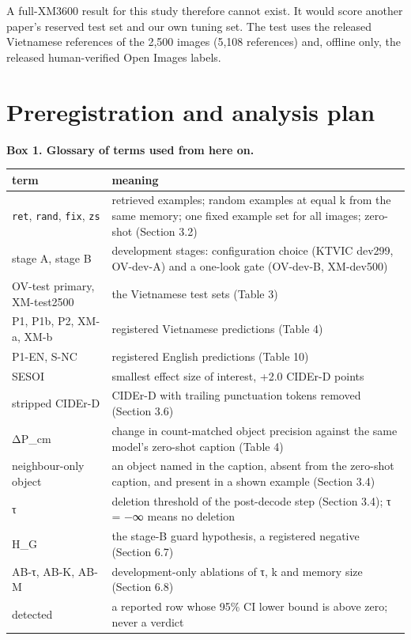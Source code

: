 A full-XM3600 result for this study therefore cannot exist. It would score another paper's reserved
test set and our own tuning set. The test uses the released Vietnamese references of the 2,500
images (5,108 references) and, offline only, the released human-verified Open Images labels.

\section{Preregistration and analysis plan}\label{preregistration-and-analysis-plan}

\textbf{Box 1. Glossary of terms used from here on.}

\begin{longtable}[]{@{}
  >{\raggedright\arraybackslash}p{}
  >{\raggedright\arraybackslash}p{}@{}}
\toprule\noalign{}
\begin{minipage}[b]{\linewidth}\raggedright
term
\end{minipage} & \begin{minipage}[b]{\linewidth}\raggedright
meaning
\end{minipage} \\
\midrule\noalign{}
\endhead
\bottomrule\noalign{}
\endlastfoot
\texttt{ret}, \texttt{rand}, \texttt{fix}, \texttt{zs} & retrieved examples; random examples at
equal k from the same memory; one fixed example set for all images; zero-shot (Section 3.2) \\
stage A, stage B & development stages: configuration choice (KTVIC dev299, OV-dev-A) and a one-look
gate (OV-dev-B, XM-dev500) \\
OV-test primary, XM-test2500 & the Vietnamese test sets (Table 3) \\
P1, P1b, P2, XM-a, XM-b & registered Vietnamese predictions (Table 4) \\
P1-EN, S-NC & registered English predictions (Table 10) \\
SESOI & smallest effect size of interest, +2.0 CIDEr-D points \\
stripped CIDEr-D & CIDEr-D with trailing punctuation tokens removed (Section 3.6) \\
ΔP\_cm & change in count-matched object precision against the same model's zero-shot caption (Table
4) \\
neighbour-only object & an object named in the caption, absent from the zero-shot caption, and
present in a shown example (Section 3.4) \\
τ & deletion threshold of the post-decode step (Section 3.4); τ = −∞ means no deletion \\
H\_G & the stage-B guard hypothesis, a registered negative (Section 6.7) \\
AB-τ, AB-K, AB-M & development-only ablations of τ, k and memory size (Section 6.8) \\
detected & a reported row whose 95\% CI lower bound is above zero; never a verdict \\
\end{longtable}


